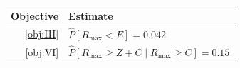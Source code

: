 \begin{tabularx}{\linewidth}{r>{\centering\arraybackslash}X}
\toprule  Objective & Estimate\\\midrule
  \ref{obj:III} & $\hat{P}[R_{\max} < E] = 0.042$\\\addlinespace
  \ref{obj:VI} & $\hat{P}[R_{\max} \ge Z + C \mid R_{\max} \ge C] = 0.15$\\\bottomrule
\end{tabularx}